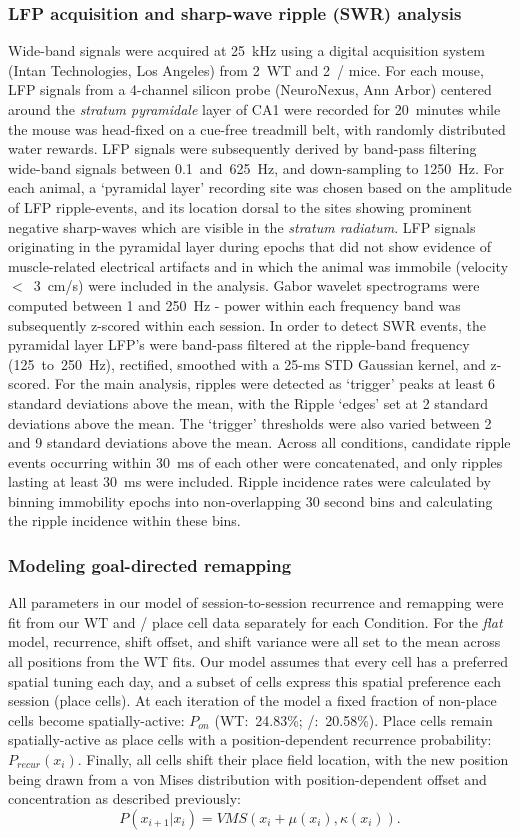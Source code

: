 \subsubsection{LFP acquisition and sharp-wave ripple (SWR) analysis}
Wide-band signals were acquired at 25~kHz using a digital acquisition system (Intan Technologies, Los Angeles) from 2~WT and 2~\df/ mice. For each mouse, LFP signals from a 4-channel silicon probe (NeuroNexus, Ann Arbor) centered around the \emph{stratum pyramidale} layer of CA1 were recorded for 20~minutes while the mouse was head-fixed on a cue-free treadmill belt, with randomly distributed water rewards. LFP signals were subsequently derived by band-pass filtering wide-band signals between 0.1~and~625~Hz, and down-sampling to 1250~Hz. For each animal, a `pyramidal layer' recording site was chosen based on the amplitude of LFP ripple-events, and its location dorsal to the sites showing prominent negative sharp-waves which are visible in the \emph{stratum radiatum}. LFP signals originating in the pyramidal layer during epochs that did not show evidence of muscle-related electrical artifacts and in which the animal was immobile (velocity $<$~3~cm/s) were included in the analysis. Gabor wavelet spectrograms were computed between 1 and 250~Hz - power within each frequency band was subsequently z-scored within each session. In order to detect SWR events, the pyramidal layer LFP's were band-pass filtered at the ripple-band frequency (125~to~250~Hz), rectified, smoothed with a 25-ms STD Gaussian kernel, and z-scored. For the main analysis, ripples were detected as `trigger' peaks at least 6 standard deviations above the mean, with the Ripple `edges' set at 2 standard deviations above the mean. The `trigger' thresholds were also varied between 2 and 9 standard deviations above the mean. Across all conditions, candidate ripple events occurring within 30~ms of each other were concatenated, and only ripples lasting at least 30~ms were included. Ripple incidence rates were calculated by binning immobility epochs into non-overlapping 30 second bins and calculating the ripple incidence within these bins.

\subsubsection{Modeling goal-directed remapping}
All parameters in our model of session-to-session recurrence and remapping were fit from our WT and \df/ place cell data separately for each Condition. For the \emph{flat} model, recurrence, shift offset, and shift variance were all set to the mean across all positions from the WT fits. Our model assumes that every cell has a preferred spatial tuning each day, and a subset of cells express this spatial preference each session (place cells). At each iteration of the model a fixed fraction of non-place cells become spatially-active: $P_{on}$ (WT:~24.83\%; \df/:~20.58\%). Place cells remain spatially-active as place cells with a position-dependent recurrence probability: $P_{recur}(x_i)$. Finally, all cells shift their place field location, with the new position being drawn from a von Mises distribution with position-dependent offset and concentration as described previously:
$$P(x_{i+1}|x_i) = VMS(x_i + \mu(x_i), \kappa(x_i)).$$

